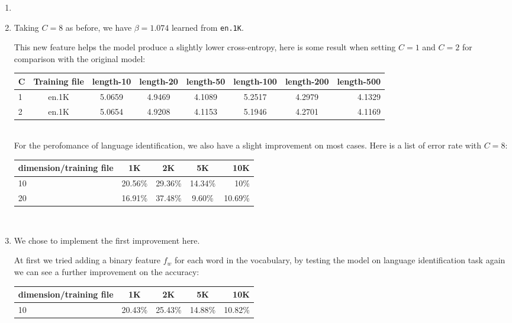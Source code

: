 \documentclass[10pt]{article}
\begin{document}
\begin{enumerate}
\begin{enumerate}
            \item
            
            \item
            Taking $C = 8$ as before, we have $\beta = 1.074$ learned from \texttt{en.1K}. 
            
            This new feature helps the model produce a slightly lower cross-entropy, here is some result when setting $C = 1$ and $C = 2$ for comparison with the original model:
            
                \begin{tabular}{| l | c | c | c | c | c | c | r |}
                \hline
                C & Training file & length-10 & length-20 & length-50 & length-100 & length-200 & length-500\\ \hline
                1 & en.1K & 5.0659 & 4.9469 & 4.1089 & 5.2517 & 4.2979 & 4.1329 \\ \hline
                2 & en.1K & 5.0654 & 4.9208 & 4.1153 & 5.1946 & 4.2701 & 4.1169 \\ \hline
              \end{tabular}  \\
              
            For the perofomance of language identification, we also have a slight improvement on most cases. Here is a list of error rate with $C = 8$:\\
            
                \begin{tabular}{| l | c | c | c | r |}
                \hline
                dimension/training file  & 1K & 2K & 5K & 10K \\ \hline
                10 & 20.56\% & 29.36\% & 14.34\% & 10\%\\ \hline
                20 & 16.91\% & 37.48\% & 9.60\% & 10.69\% \\ \hline
              \end{tabular} \\ 
              
            \item %
            We chose to implement the first improvement here.
            
            At first we tried adding a binary feature $f_w$ for each word in the vocabulary, by testing the model on language identification task again we can see a further improvement on the accuracy:
            
              \begin{tabular}{| l | c | c | c | r |}
                \hline
                dimension/training file  & 1K & 2K & 5K & 10K \\ \hline
                10 & 20.43\% & 25.43\% & 14.88\% & 10.82\%\\ \hline
              \end{tabular} \\   
                  

\end{enumerate}
\end{enumerate}
\end{document}

